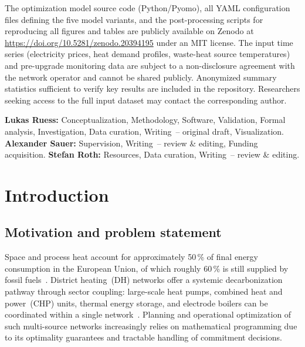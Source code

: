 \documentclass[review,3p]{elsarticle}
\begin{document}
\begin{frontmatter}
\begin{dataavailability}
The optimization model source code (Python/Pyomo), all YAML
configuration files defining the five model variants, and the
post-processing scripts for reproducing all figures and tables are
publicly available on Zenodo at
\url{https://doi.org/10.5281/zenodo.20394195} under an MIT license.
The input time series (electricity prices, heat demand profiles,
waste-heat source temperatures) and pre-upgrade monitoring data are
subject to a non-disclosure agreement with the network operator and
cannot be shared publicly. Anonymized summary statistics sufficient
to verify key results are included in the repository. Researchers
seeking access to the full input dataset may contact the
corresponding author.
\end{dataavailability}

\begin{credit}
\textbf{Lukas Ruess:} Conceptualization, Methodology, Software,
Validation, Formal analysis, Investigation, Data curation,
Writing~-- original draft, Visualization.
\textbf{Alexander Sauer:} Supervision, Writing~-- review \& editing,
Funding acquisition.
\textbf{Stefan Roth:} Resources, Data curation,
Writing~-- review \& editing.
\end{credit}

\end{frontmatter}

\linenumbers

\section{Introduction}
\label{sec:introduction}

\subsection{Motivation and problem statement}
\label{sec:motivation}

Space and process heat account for approximately 50\,\% of final
energy consumption in the European Union, of which roughly 60\,\% is
still supplied by fossil fuels~\cite{EUheating2016}. District
heating~(DH) networks offer a systemic decarbonization pathway
through sector coupling: large-scale heat pumps, combined heat and
power~(CHP) units, thermal energy storage, and electrode boilers can
be coordinated within a single network~\cite{Lund2014_4GDH,Werner2017}.
Planning and operational optimization of such multi-source networks
increasingly relies on mathematical programming due to its optimality
guarantees and tractable handling of commitment decisions.
\end{document}
